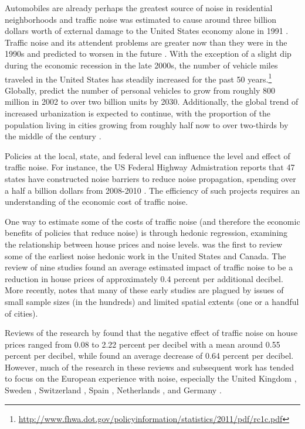 \documentclass{article}\usepackage{graphicx, color}
\begin{document}
Automobiles are already perhaps the greatest source of noise in residential neighborhoods \citep{Barber2010} and traffic noise was estimated to cause around three billion dollars worth of external damage to the United States economy alone in 1991 \citep{Delucchi1998}. Traffic noise and its attendent problems are greater now than they were in the 1990s and predicted to worsen in the future \citep{Goines2007}.  With the exception of a slight dip during the economic recession in the late 2000s, the number of vehicle miles traveled in the United States has steadily increased for the past 50 years.\footnote{\url{http://www.fhwa.dot.gov/policyinformation/statistics/2011/pdf/rc1c.pdf}} Globally, \citet{Dargay2007} predict the number of personal vehicles to grow from roughly 800 million in 2002 to over two billion units by 2030. Additionally, the global trend of increased urbanization is expected to continue, with the proportion of the population living in cities growing from roughly half now to over two-thirds by the middle of the century . 

Policies at the local, state, and federal level can influence the level and effect of traffic noise. For instance, the US Federal Highway Admistration reports that 47 states have constructed noise barriers to reduce noise propagation, spending over a half a billion dollars from 2008-2010 . The efficiency of such projects requires an understanding of the economic cost of traffic noise. 

One way to estimate some of the costs of traffic noise (and therefore the economic benefits of policies that reduce noise) is through hedonic regression, examining the relationship between house prices and noise levels. \citet{Nelson1982} was the first to review some of the earliest noise hedonic work in the United States and Canada. The review of nine studies found an average estimated impact of traffic noise to be a reduction in house prices of approximately 0.4 percent per additional decibel. More recently, \citet{Nelson2008} notes that many of these early studies \citep[such as][]{Gamble1974, Langley1976} are plagued by issues of small sample sizes (in the hundreds) and limited spatial extents (one or a handful of cities). 

Reviews of the research by \citet{Bateman2001} found that the negative effect of traffic noise on house prices ranged from 0.08 to 2.22 percent per decibel with a mean around 0.55 percent per decibel, while \citet{Navrud2002} found an average decrease of 0.64 percent per decibel. However, much of the research in these reviews and subsequent work has tended to focus on the European experience with noise, especially the United Kingdom \citep{Day2007, Blanco2011}, Sweden \citep{Wilhelmsson2000, Andersson2010}, Switzerland \citep{Baranzini2010}, Spain \citep{MarmolejoDuarteCarlos;GonzalezTamez2009}, Netherlands \citep{Theebe2004a}, and Germany \citep{Brandt2011}. 
\end{document}
